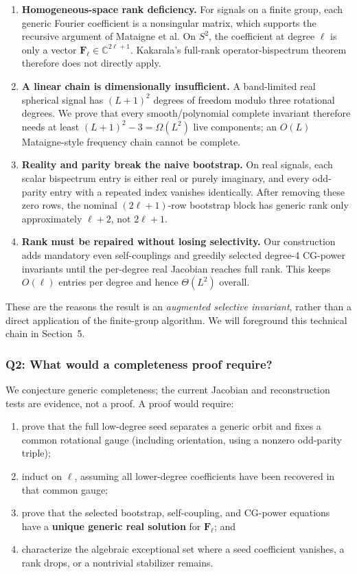 \documentclass[10pt]{article}
\begin{document}
\begin{enumerate}
\item \textbf{Homogeneous-space rank deficiency.} For signals on a finite
  group, each generic Fourier coefficient is a nonsingular matrix, which
  supports the recursive argument of Mataigne et al. On $S^2$, the
  coefficient at degree $\ell$ is only a vector
  $\mathbf F_\ell\in\mathbb C^{2\ell+1}$. Kakarala's full-rank
  operator-bispectrum theorem therefore does not directly apply.
\item \textbf{A linear chain is dimensionally insufficient.} A band-limited
  real spherical signal has $(L+1)^2$ degrees of freedom modulo three
  rotational degrees. We prove that every smooth/polynomial complete
  invariant therefore needs at least $(L+1)^2-3=\Omega(L^2)$ live components;
  an $O(L)$ Mataigne-style frequency chain cannot be complete.
\item \textbf{Reality and parity break the naive bootstrap.} On real
  signals, each scalar bispectrum entry is either real or purely imaginary,
  and every odd-parity entry with a repeated index vanishes identically.
  After removing these zero rows, the nominal $(2\ell+1)$-row bootstrap block
  has generic rank only approximately $\ell+2$, not $2\ell+1$.
\item \textbf{Rank must be repaired without losing selectivity.} Our
  construction adds mandatory even self-couplings and greedily selected
  degree-4 CG-power invariants until the per-degree real Jacobian reaches
  full rank. This keeps $O(\ell)$ entries per degree and hence $\Theta(L^2)$
  overall.
\end{enumerate}

These are the reasons the result is an \emph{augmented selective invariant},
rather than a direct application of the finite-group algorithm. We will
foreground this technical chain in Section~5.

\subsubsection*{Q2: What would a completeness proof require?}

We conjecture generic completeness; the current Jacobian and reconstruction
tests are evidence, not a proof. A proof would require:

\begin{enumerate}
\item prove that the full low-degree seed separates a generic orbit and fixes
  a common rotational gauge (including orientation, using a nonzero
  odd-parity triple);
\item induct on $\ell$, assuming all lower-degree coefficients have been
  recovered in that common gauge;
\item prove that the selected bootstrap, self-coupling, and CG-power
  equations have a \textbf{unique generic real solution} for
  $\mathbf F_\ell$; and
\item characterize the algebraic exceptional set where a seed coefficient
  vanishes, a rank drops, or a nontrivial stabilizer remains.
\end{enumerate}
\end{document}

